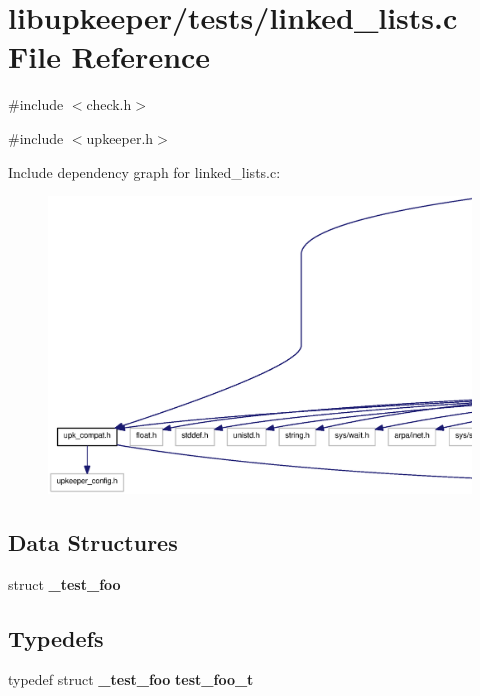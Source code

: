 \section{libupkeeper/tests/linked\_\-lists.c File Reference}
\label{linked__lists_8c}
{\ttfamily \#include $<$check.h$>$}\par
{\ttfamily \#include $<$upkeeper.h$>$}\par
Include dependency graph for linked\_\-lists.c:\nopagebreak
\begin{figure}[H]
\begin{center}
\leavevmode
\includegraphics[width=400pt]{linked__lists_8c__incl}
\end{center}
\end{figure}
\subsection*{Data Structures}
\begin{DoxyCompactItemize}
\item 
struct {\bf \_\-test\_\-foo}
\end{DoxyCompactItemize}
\subsection*{Typedefs}
\begin{DoxyCompactItemize}
\item 
typedef struct {\bf \_\-test\_\-foo} {\bf test\_\-foo\_\-t}
\end{DoxyCompactItemize}
